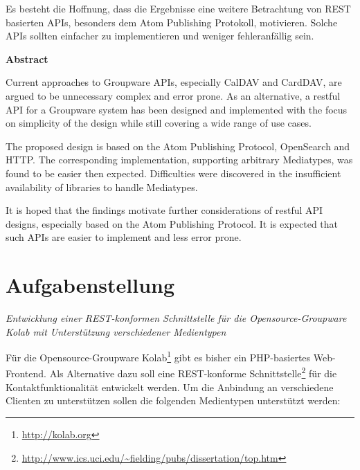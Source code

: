 \documentclass[11pt,a4paper,headsepline,twoside]{scrartcl}		%
\begin{document}
Es besteht die Hoffnung, dass die Ergebnisse eine weitere Betrachtung von REST
basierten APIs, besonders dem Atom Publishing Protokoll, motivieren. Solche APIs
sollten einfacher zu implementieren und weniger fehleranfällig sein.

\vspace{1cm}
\Large{\textbf{Abstract}}
\vspace{1cm}
\normalsize{}


  
  Current approaches to Groupware APIs, especially CalDAV and CardDAV, are
  argued to be unnecessary complex and error prone.  As an alternative, a
  restful API for a Groupware system has been designed and implemented with the
  focus on simplicity of the design while still covering a wide range of use
  cases.

  The proposed design is based on the Atom Publishing Protocol, OpenSearch
  and HTTP.
  The corresponding implementation, supporting arbitrary Mediatypes, was found
  to be easier then expected. Difficulties were discovered in the insufficient
  availability of libraries to handle Mediatypes.

  It is hoped that the findings motivate further considerations of restful API
  designs, especially based on the Atom Publishing Protocol. It is expected that
  such APIs are easier to implement and less error prone.

\section*{Aufgabenstellung}
\pagestyle{headings}
\textit{Entwicklung einer REST-konformen Schnittstelle für die 
Opensource-Groupware Kolab mit Unterstützung verschiedener Medientypen}

Für die Opensource-Groupware Kolab\footnote{\url{http://kolab.org}} gibt es
bisher ein PHP-basiertes Web-Frontend. Als Alternative dazu soll eine
REST-konforme
Schnittstelle\footnote{\url{http://www.ics.uci.edu/~fielding/pubs/dissertation/top.htm}}
für die Kontaktfunktionalität entwickelt werden. Um die Anbindung an
verschiedene Clienten zu unterstützen sollen die folgenden Medientypen
unterstützt werden:
\end{document}

